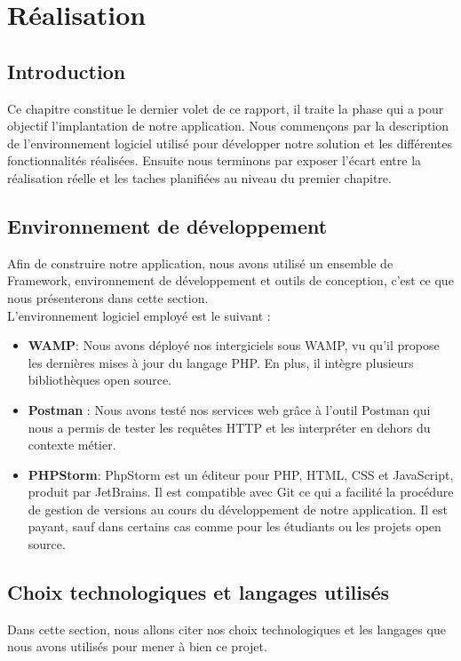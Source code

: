 \chapter{Réalisation}
	
\section{Introduction}
Ce chapitre constitue le dernier volet de ce rapport, il traite la phase qui a pour objectif l’implantation de notre application. Nous commençons par la description de l’environnement logiciel utilisé pour développer notre solution et les différentes fonctionnalités réalisées. Ensuite nous terminons par exposer l'écart entre la réalisation réelle et les taches planifiées au niveau du premier chapitre.
\section{Environnement de développement}
Afin de construire notre application, nous avons utilisé un ensemble de Framework, environnement de développement et outils
de conception, c'est ce que nous présenterons dans cette section.\\
L’environnement logiciel employé est le suivant :
\begin{itemize}
\item \textbf{WAMP}: Nous avons déployé nos intergiciels sous WAMP, vu qu’il propose les dernières mises à jour du langage PHP. En plus, il intègre plusieurs bibliothèques open source.
\item \textbf{Postman} : Nous avons testé nos services web grâce à l’outil Postman qui nous a permis de tester les requêtes HTTP et les interpréter en dehors du contexte métier.
\item \textbf{PHPStorm}: PhpStorm est un éditeur pour PHP, HTML, CSS et JavaScript, produit par JetBrains.
Il est compatible avec Git ce qui a facilité la procédure de gestion de versions au cours du développement de notre application.
Il est payant, sauf dans certains cas comme pour les étudiants ou les projets open source.
\end{itemize}

\section{Choix technologiques et langages utilisés}
Dans cette section, nous allons citer nos choix technologiques et les langages que nous avons utilisés pour mener à bien ce projet.
